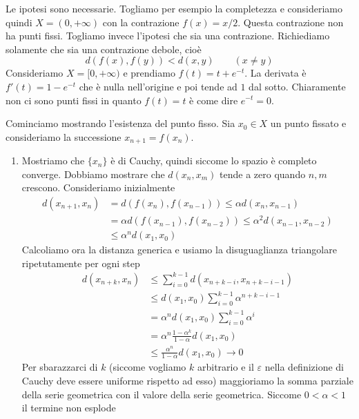 \documentclass[a4paper]{article}
\begin{document}
Le ipotesi sono necessarie.
Togliamo per esempio la completezza e consideriamo quindi \(X=(0, +\infty)\)
con la contrazione \(f(x) = x/2\). Questa contrazione non ha punti fissi.
Togliamo invece l'ipotesi che sia una contrazione.
Richiediamo solamente che sia una contrazione debole, cioè
\[
    d(f(x), f(y)) < d(x,y) \qquad (x\neq y)
\]
Consideriamo \(X = [0, +\infty)\) e prendiamo
\(f(t) = t + e^{-t}\). 
La derivata è \(f'(t) = 1-e^{-t}\) che è nulla nell'origine
e poi tende ad \(1\) dal sotto.
Chiaramente non ci sono punti fissi in quanto \(f(t)=t\) è come dire \(e^{-t} = 0\).

\begin{snippetproof}{}
    Cominciamo mostrando l'esistenza del punto fisso.
    Sia \(x_0 \in X\) un punto fissato e
    consideriamo la successione \(x_{n+1} = f(x_n)\).
    \begin{enumerate}
        \item Mostriamo che \(\{x_n\}\) è di Cauchy, quindi siccome lo spazio è completo
        converge. Dobbiamo mostrare che \(d(x_n, x_m)\) tende a zero quando \(n,m\) crescono.
        Consideriamo inizialmente
        \begin{align*}
            d(x_{n+1}, x_n) &= d(f(x_n), f(x_{n-1})) \leq \alpha d(x_n, x_{n-1}) \\
            &= \alpha d(f(x_{n-1}), f(x_{n-2})) \leq \alpha^2 d(x_{n-1}, x_{n-2}) \\
            &\leq \alpha^n d(x_1, x_0)
        \end{align*}
        Calcoliamo ora la distanza generica e usiamo la disuguaglianza triangolare
        ripetutamente per ogni step
        \begin{align*}
            d(x_{n+k}, x_n) &\leq \sum_{i=0}^{k-1} d(x_{n+k-i}, x_{n+k-i-1}) \\
            &\leq d(x_1, x_0) \sum_{i=0}^{k-1} \alpha^{n+k-i-1} \\
            &= \alpha^n d(x_1, x_0) \sum_{i=0}^{k-1} \alpha^i \\
            &= \alpha^n \frac{1 - \alpha^k}{1 - \alpha} d(x_1, x_0) \\
            &\leq \frac{\alpha^n}{1 - \alpha} d(x_1, x_0) \to 0
        \end{align*}
        Per sbarazzarci di \(k\) (siccome vogliamo \(k\) arbitrario e il \(\varepsilon\)
        nella definizione di Cauchy deve essere uniforme rispetto ad esso)
        maggioriamo la somma parziale della serie geometrica
        con il valore della serie geometrica. Siccome \(0 < \alpha < 1\) il termine non esplode

\end{enumerate}
\end{snippetproof}
\end{document}
